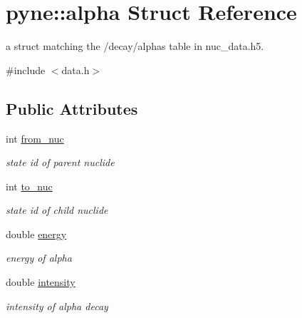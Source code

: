 \hypertarget{structpyne_1_1alpha}{}\section{pyne\+:\+:alpha Struct Reference}
\label{structpyne_1_1alpha}


a struct matching the \textquotesingle{}/decay/alphas\textquotesingle{} table in nuc\+\_\+data.\+h5.  




{\ttfamily \#include $<$data.\+h$>$}

\subsection*{Public Attributes}
\begin{DoxyCompactItemize}
\item 
\mbox{\label{structpyne_1_1alpha_af41fd4e97378d30f3fbc9f01999b2d2a}} 
int \hyperlink{structpyne_1_1alpha_af41fd4e97378d30f3fbc9f01999b2d2a}{from\+\_\+nuc}
\begin{DoxyCompactList}\small\item\em state id of parent nuclide \end{DoxyCompactList}\item 
\mbox{\label{structpyne_1_1alpha_ab099ce46072d7022caf1a49de2e0974b}} 
int \hyperlink{structpyne_1_1alpha_ab099ce46072d7022caf1a49de2e0974b}{to\+\_\+nuc}
\begin{DoxyCompactList}\small\item\em state id of child nuclide \end{DoxyCompactList}\item 
\mbox{\label{structpyne_1_1alpha_a5f1aa6a1d0e8c02a0967ee160e35fdb2}} 
double \hyperlink{structpyne_1_1alpha_a5f1aa6a1d0e8c02a0967ee160e35fdb2}{energy}
\begin{DoxyCompactList}\small\item\em energy of alpha \end{DoxyCompactList}\item 
\mbox{\label{structpyne_1_1alpha_a56e40c800fbe36f1d62113ddf4c162e7}} 
double \hyperlink{structpyne_1_1alpha_a56e40c800fbe36f1d62113ddf4c162e7}{intensity}
\begin{DoxyCompactList}\small\item\em intensity of alpha decay \end{DoxyCompactList}\end{DoxyCompactItemize}


